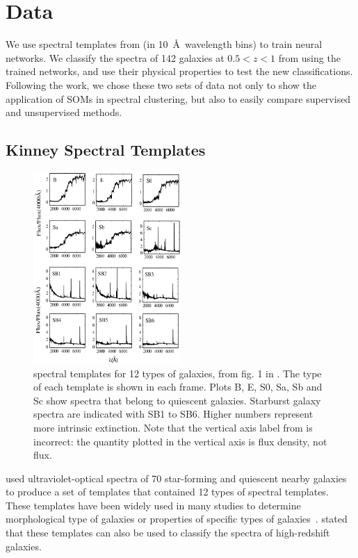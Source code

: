 \section{Data}
\label{sec: data_highZ}
We use spectral templates from  (in 10~\AA\ wavelength bins) to train neural networks. 
We classify the spectra of 142 galaxies at $0.5<z<1$ from  using the trained networks, and use their physical properties to test the new classifications.
Following the  work, we chose these two sets of data not only to show the application of SOMs in spectral clustering, but also to easily compare supervised and unsupervised methods.


 \subsection{Kinney Spectral Templates}
     \begin{figure}
        \centering
        \includegraphics[width=0.5\textwidth]{images/k96.jpg}
        \caption[\citet{Kinney96} spectral templates for 12 types of galaxies]{\citet{Kinney96} spectral templates for 12 types of galaxies, from fig. 1 in \citet{Hossein12}. The type of each template is shown in each frame. Plots B, E, S0, Sa, Sb and Sc show spectra that belong to quiescent galaxies. Starburst galaxy spectra are indicated with SB1 to SB6. Higher numbers represent more intrinsic extinction. Note that the vertical axis label from \citet{Hossein12} is incorrect:  the quantity plotted in the vertical axis is flux density, not flux.}
        \label{fig: k96}
    \end{figure}
      
     used ultraviolet-optical spectra of 70 star-forming and quiescent nearby galaxies to produce a set of templates that contained 12 types of spectral templates.
    These templates have been widely used in many studies to determine morphological type of galaxies or properties of specific types of galaxies~\citep[e.g.][]{Shakouri16, Paiano16, Laporte16, Holden16}.
     stated that these templates can also be used to classify the spectra of high-redshift galaxies. 
    
